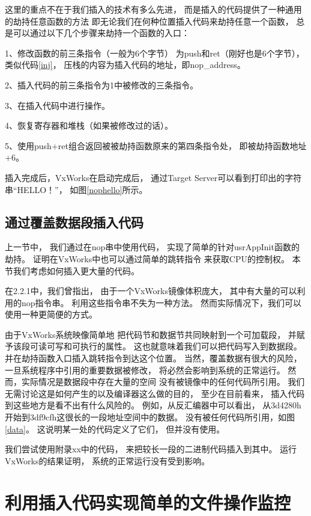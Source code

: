 这里的重点不在于我们插入的技术有多么先进，
而是插入的代码提供了一种通用的劫持任意函数的方法
即无论我们在何种位置插入代码来劫持任意一个函数，
总是可以通过以下几个步骤来劫持一个函数的入口：

1、修改函数的前三条指令（一般为6个字节）
为push和ret（刚好也是6个字节），类似代码\ref{inj}，
压栈的内容为插入代码的地址，即nop\_address。

2、插入代码的前三条指令为1中被修改的三条指令。

3、在插入代码中进行操作。

4、恢复寄存器和堆栈（如果被修改过的话）。

5、使用push+ret组合返回被被劫持函数原来的第四条指令处，
即被劫持函数地址+6。

插入完成后，VxWorks在启动完成后，
通过Target Server可以看到打印出的字符串“HELLO！”，
如图\ref{nophello}所示。



\subsection{通过覆盖数据段插入代码}

上一节中，
我们通过在nop串中使用代码，
实现了简单的针对usrAppInit函数的劫持。
证明在VxWorks中也可以通过简单的跳转指令
来获取CPU的控制权。
本节我们考虑如何插入更大量的代码。

在2.2.1中，我们曾指出，
由于一个VxWorks镜像体积庞大，
其中有大量的可以利用的nop指令串。
利用这些指令串不失为一种方法。
然而实际情况下，我们可以使用一种更简便的方式。

由于VxWorks系统映像简单地
把代码节和数据节共同映射到一个可加载段，
并赋予该段可读可写和可执行的属性。
这也就意味着我们可以把代码写入到数据段。
并在劫持函数入口插入跳转指令到达这个位置。
当然，覆盖数据有很大的风险，
一旦系统程序中引用的重要数据被修改，
将必然会影响到系统的正常运行。
然而，实际情况是数据段中存在大量的空间
没有被镜像中的任何代码所引用。
我们无需讨论这是如何产生的以及编译器这么做的目的，
至少在目前看来，
插入代码到这些地方是看不出有什么风险的。
例如，从反汇编器中可以看出，
从3d4280h开始到3df9cfh这很长的一段地址空间中的数据。
没有被任何代码所引用，如图\ref{data}。
这说明某一处的代码定义了它们，
但并没有使用。

我们尝试使用附录xx中的代码，
来把较长一段的二进制代码插入到其中。
运行VxWorks的结果证明，
系统的正常运行没有受到影响。


\section{利用插入代码实现简单的文件操作监控}

